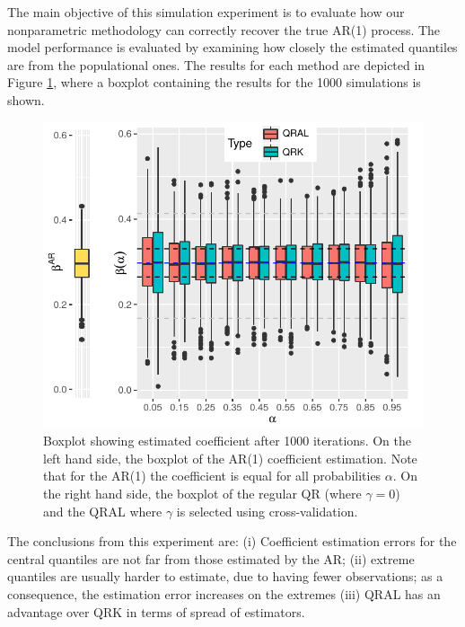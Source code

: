 The main objective of this simulation experiment is to evaluate how our nonparametric methodology can correctly recover the true AR(1) process. The model performance is evaluated by examining how closely the estimated quantiles are from the populational ones. The results for each method are depicted in Figure \ref{fig:boxplot-ar1}, where a boxplot containing the results for the 1000 simulations is shown. %
\begin{figure}[h]
	\centering
	\includegraphics[width=1.0\linewidth]{Images/boxplot-ar1.pdf}
	\caption{Boxplot showing estimated coefficient after 1000 iterations. On the left hand side, the boxplot of the AR(1) coefficient estimation. Note that for the AR(1) the coefficient is equal for all probabilities $\alpha$. On the right hand side, the boxplot of the regular QR (where $\gamma = 0$) and the QRAL where $\gamma$ is selected using cross-validation. }
	\label{fig:boxplot-ar1}
\end{figure}
The conclusions from this experiment are: (i) Coefficient estimation errors for the central quantiles are not far from those estimated by the AR; (ii) extreme quantiles are usually harder to estimate, due to having fewer observations; as a consequence, the estimation error increases on the extremes (iii) QRAL has an advantage over QRK in terms of spread of estimators.



